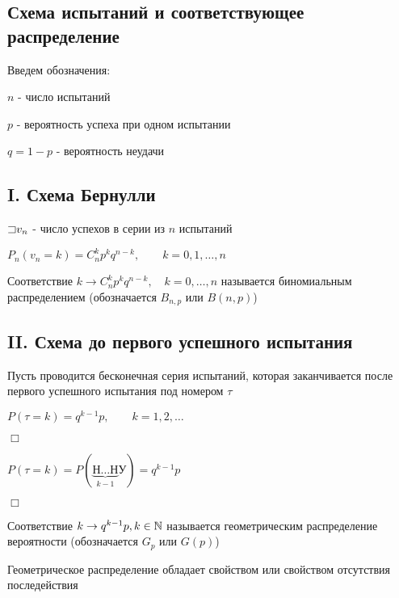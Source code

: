 \documentclass[12pt]{article}
\begin{document}
    \subsection{Схема испытаний и соответствующее распределение}

    Введем обозначения:

    $n$ - число испытаний

    $p$ - вероятность успеха при одном испытании

    $q = 1 - p$ - вероятность неудачи

    \subsection{I. Схема Бернулли}

    $\mathord{\sqsupset} v_n$ - число успехов в серии из $n$ испытаний

    $P_n(v_n = k) = C^k_n p^k q^{n - k}, \quad\quad k = 0, 1, \dots, n$

    \Def Соответствие $k \rightarrow C^k_n p^k q^{n - k}, \quad k = 0, \dots, n$ называется биномиальным распределением
    (обозначается $B_{n,p}$ или $B(n, p)$)

    \subsection{II. Схема до первого успешного испытания}

    Пусть проводится бесконечная серия испытаний, которая заканчивается после первого успешного испытания
    под номером $\tau$

    \begin{MyTheorem}
        \Ths $P(\tau = k) = q^{k - 1} p, \quad\quad k = 1, 2, \dots$
    \end{MyTheorem}

    \begin{MyProof}
        $\Box$

        $P(\tau = k) = P(\underset{k - 1}{\underbrace{\text{Н}\dots\text{Н}}}\text{У}) = q^{k - 1}p$

        $\Box$
    \end{MyProof}

    \Def Соответствие $k \rightarrow q^{k - 1} p, k \in \mathbb{N}$ называется геометрическим
    распределение вероятности (обозначается $G_p$ или $G(p)$)

    \Nota Геометрическое распределение обладает свойством  или свойством отсутствия
    последействия
\end{document}

